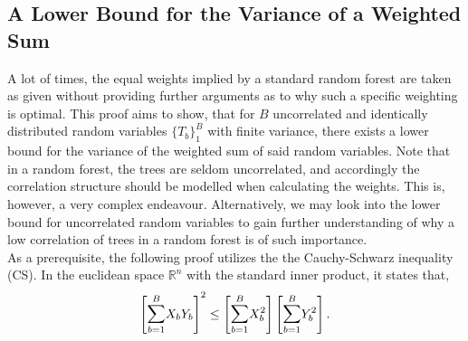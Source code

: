 \documentclass[a4paper,12pt, headsepline]{scrartcl}
\numberwithin{equation}{section}
\begin{document}
 \subsection{A Lower Bound for the Variance of a Weighted Sum}\label{App:A5}
 A lot of times, the equal weights implied by a standard random forest are taken as given without providing further arguments as to why such a specific weighting is optimal. This proof aims to show, that for $B$ uncorrelated and identically distributed random variables $\{T_b\}_1^B$ with finite variance, there exists a lower bound for the variance of the weighted sum of said random variables. Note that in a random forest, the trees are seldom uncorrelated, and accordingly the correlation structure should be modelled when calculating the weights. This is, however, a very complex endeavour. Alternatively, we may look into the lower bound for uncorrelated random variables to gain further understanding of why a low correlation of trees in a random forest is of such importance.\\ As a prerequisite, the following proof utilizes the the Cauchy-Schwarz inequality (CS). In the euclidean space $\mathbb{R}^n$ with the standard inner product, it states that,
 \[
 \left[\mathlarger{\sum}\limits_{b = 1}^B X_bY_b \right]^2 \leq \left[\mathlarger{\sum}\limits_{b = 1}^B X_b^2\right] \left[\mathlarger{\sum}\limits_{b = 1}^B Y_b^2\right].
 \]
\end{document}

